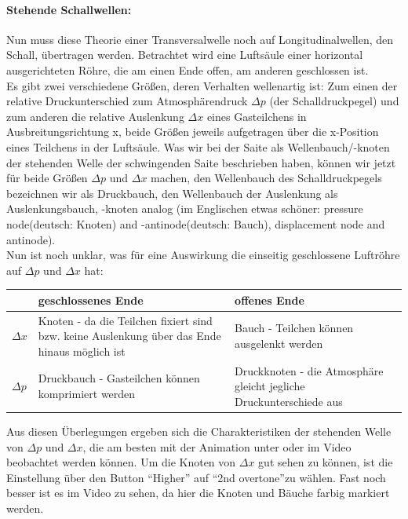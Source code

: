\paragraph{Stehende Schallwellen:}
Nun muss diese Theorie einer Transversalwelle noch auf Longitudinalwellen, den Schall, übertragen werden. Betrachtet wird eine Luftsäule einer horizontal ausgerichteten Röhre, die am einen Ende offen, am anderen geschlossen ist.\\
Es gibt zwei verschiedene Größen, deren Verhalten wellenartig ist: Zum einen der relative Druckunterschied zum Atmosphärendruck \(\Delta p\) (der Schalldruckpegel) und zum anderen die relative Auslenkung \(\Delta x\) eines Gasteilchens in Ausbreitungsrichtung x, beide Größen jeweils aufgetragen über die x-Position eines Teilchens in der Luftsäule. Was wir bei der Saite als Wellenbauch/-knoten der stehenden Welle der schwingenden Saite beschrieben haben, können wir jetzt für beide Größen \(\Delta p\) und \(\Delta x\) machen, den Wellenbauch des Schalldruckpegels bezeichnen wir als Druckbauch, den Wellenbauch der Auslenkung als Auslenkungsbauch, -knoten analog (im Englischen etwas schöner: pressure node(deutsch: Knoten) and -antinode(deutsch: Bauch), displacement node and antinode).\\ 
Nun ist noch unklar, was für eine Auswirkung die einseitig geschlossene Luftröhre auf \(\Delta p\) und \(\Delta x\) hat:
\begin{center}
\begin{tabular}{ m{4em} | p{6cm} | p{7cm} } 
    & geschlossenes Ende & offenes Ende \\ [0.5ex] 
 \hline
 \(\Delta x\) & Knoten - da die Teilchen fixiert sind bzw. keine Auslenkung über das Ende hinaus möglich ist & Bauch - Teilchen können ausgelenkt werden\\ 
 \hline
 \(\Delta p\) & Druckbauch - Gasteilchen können komprimiert werden & Druckknoten - die Atmosphäre gleicht jegliche Druckunterschiede aus\\
 \hline
\end{tabular}
\end{center}

Aus diesen Überlegungen ergeben sich die Charakteristiken der stehenden Welle von \(\Delta p\) und \(\Delta x\), die am besten mit der Animation unter \autocite{Animation} oder im Video \autocite{Video} beobachtet werden können. Um die Knoten von \(\Delta x\) gut sehen zu können, ist die Einstellung über den Button \enquote{Higher} auf \enquote{2nd overtone}zu wählen. Fast noch besser ist es im Video zu sehen, da hier die Knoten und Bäuche farbig markiert werden.

